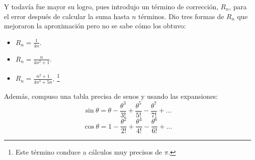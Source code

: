 \documentclass[a4paper, 11pt]{article}
\begin{document}
		Y todavía fue mayor su logro, pues introdujo un término de corrección, $R_n$, para el error después de calcular
		la suma hasta $n$ términos. Dio tres formas de $R_n$ que mejoraron la aproximación pero no se sabe cómo los
		obtuvo:
		\begin{itemize}
			\item $\displaystyle R_n = \frac{1}{4n}$.
			\item $\displaystyle R_n = \frac{n}{4n^2 + 1}$.
			\item $\displaystyle R_n = \frac{n^2 + 1}{4n^3 + 5n}$. \footnote{Este término conduce a cálculos muy precisos de $\pi$.}
		\end{itemize}
		
		Además, compuso una tabla precisa de senos y usando las expansiones:
		$$\sin \theta = \theta - \frac{\theta^3}{3!} + \frac{\theta^5}{5!} - \frac{\theta^7}{7!} + \dots $$
		$$\cos \theta = 1 - \frac{\theta^2}{2!} + \frac{\theta^4}{4!} - \frac{\theta^6}{6!} + \dots $$
		
\newpage
{}

\end{document}
